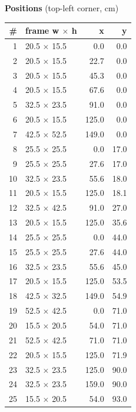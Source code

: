 \documentclass[a4paper,landscape,10pt]{article}
\begin{document}
\begin{minipage}[t]{0.25\textwidth}
\vspace{8pt}
{\bfseries Positions} (top-left corner, cm)\\[2pt]
\tiny
\begin{tabular}{@{}r l r r@{}}
\toprule
\# & frame w $\times$ h & x & y \\
\midrule
1 & 20.5 $\times$ 15.5 & 0.0 & 0.0 \\
2 & 20.5 $\times$ 15.5 & 22.7 & 0.0 \\
3 & 20.5 $\times$ 15.5 & 45.3 & 0.0 \\
4 & 20.5 $\times$ 15.5 & 67.6 & 0.0 \\
5 & 32.5 $\times$ 23.5 & 91.0 & 0.0 \\
6 & 20.5 $\times$ 15.5 & 125.0 & 0.0 \\
7 & 42.5 $\times$ 52.5 & 149.0 & 0.0 \\
8 & 25.5 $\times$ 25.5 & 0.0 & 17.0 \\
9 & 25.5 $\times$ 25.5 & 27.6 & 17.0 \\
10 & 32.5 $\times$ 23.5 & 55.6 & 18.0 \\
11 & 20.5 $\times$ 15.5 & 125.0 & 18.1 \\
12 & 32.5 $\times$ 42.5 & 91.0 & 27.0 \\
13 & 20.5 $\times$ 15.5 & 125.0 & 35.6 \\
14 & 25.5 $\times$ 25.5 & 0.0 & 44.0 \\
15 & 25.5 $\times$ 25.5 & 27.6 & 44.0 \\
16 & 32.5 $\times$ 23.5 & 55.6 & 45.0 \\
17 & 20.5 $\times$ 15.5 & 125.0 & 53.5 \\
18 & 42.5 $\times$ 32.5 & 149.0 & 54.9 \\
19 & 52.5 $\times$ 42.5 & 0.0 & 71.0 \\
20 & 15.5 $\times$ 20.5 & 54.0 & 71.0 \\
21 & 52.5 $\times$ 42.5 & 71.0 & 71.0 \\
22 & 20.5 $\times$ 15.5 & 125.0 & 71.9 \\
23 & 32.5 $\times$ 23.5 & 125.0 & 90.0 \\
24 & 32.5 $\times$ 23.5 & 159.0 & 90.0 \\
25 & 15.5 $\times$ 20.5 & 54.0 & 93.0 \\
\bottomrule
\end{tabular}
\end{minipage}
\clearpage
\end{document}
